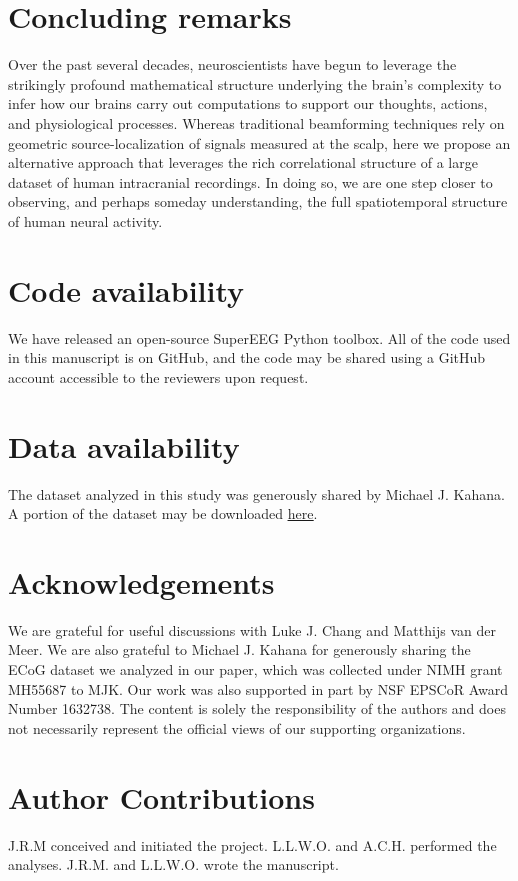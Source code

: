 \documentclass[11pt]{article}
\begin{document}
\section*{Concluding remarks}
Over the past several decades, neuroscientists have begun to leverage
the strikingly profound mathematical structure underlying the brain's
complexity to infer how our brains carry out computations to support
our thoughts, actions, and physiological processes.  Whereas
traditional beamforming techniques rely on geometric
source-localization of signals measured at the scalp, here we propose
an alternative approach that leverages the rich correlational
structure of a large dataset of human intracranial recordings.  In
doing so, we are one step closer to observing, and perhaps
someday understanding, the full spatiotemporal structure of human
neural activity.

\section*{Code availability}
We have released an open-source SuperEEG Python toolbox.  All of the code used in this manuscript is on GitHub, and the code may be shared using a GitHub account accessible to the reviewers upon request.

\section*{Data availability}
The dataset analyzed in this study was generously shared by Michael J. Kahana.  A portion of the dataset may be downloaded \href{http://memory.psych.upenn.edu/Request_EEG_access?paper=SedeEtal03}{\underline{here}}.
\section*{Acknowledgements}
We are grateful for useful discussions with Luke J. Chang and Matthijs van der Meer.  We are also grateful to Michael J. Kahana for generously sharing
the ECoG dataset we analyzed in our paper, which was collected under
NIMH grant MH55687 to MJK.  Our work was also supported in part by NSF EPSCoR Award Number 1632738.  The content is solely the responsibility of the authors and does not necessarily represent the official views of our supporting organizations.
\section*{Author Contributions}
J.R.M conceived and initiated the project. L.L.W.O. and A.C.H. performed the analyses. J.R.M. and L.L.W.O. wrote the manuscript.
\end{document}
